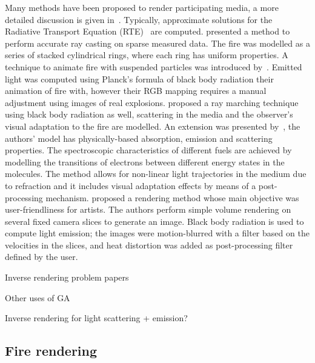 \documentclass{acmsiggraph}
\begin{document}
Many methods have been proposed to render participating media, a more detailed discussion is given in~\cite{Huang:2014}.
Typically, approximate solutions for the Radiative Transport Equation (RTE)~\cite{Howell:2002} are computed.
\cite{Rushmeier:1995} presented a method to perform accurate ray casting on sparse measured data.
The fire was modelled as a series of stacked cylindrical rings, where each ring has uniform properties.
A technique to animate fire with suspended particles was introduced by~\cite{Feldman:2003}.
Emitted light was computed using Planck's formula of black body radiation their animation of fire with, however their RGB mapping requires a manual adjustment using images of real explosions.
\cite{Nguyen:2002} proposed a ray marching technique using black body radiation as well, scattering in the media and the observer's visual adaptation to the fire are modelled.
An extension was presented by~\cite{Pegoraro:2006}, the authors' model has physically-based absorption, emission and scattering properties.
The spectroscopic characteristics of different fuels are achieved by modelling the transitions of electrons between different energy states in the molecules.
The method allows for non-linear light trajectories  in the medium due to refraction and it includes visual adaptation effects by means of a post-processing mechanism.
\cite{Horvath:2009} proposed a rendering method whose main objective was user-friendliness for artists.
The authors perform simple volume rendering on several fixed camera slices to generate an image.
Black body radiation is used to compute light emission; the images were motion-blurred with a filter based on the velocities in the slices, and heat distortion was added as post-processing filter defined by the user. 

Inverse rendering problem papers

Other uses of GA

Inverse rendering for light scattering + emission?

\subsection{Fire rendering}
\end{document}
